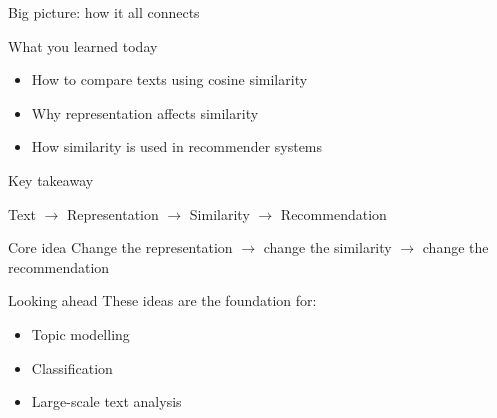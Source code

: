 \documentclass[compress]{beamer}
\begin{document}
\begin{frame}{Big picture: how it all connects}
\centering
{}

\vspace{0.6cm}

\begin{block}{What you learned today}
\begin{itemize}
\item How to compare texts using cosine similarity
\item Why representation affects similarity
\item How similarity is used in recommender systems
\end{itemize}
\end{block}
\end{frame}

\begin{frame}{Key takeaway}
\begin{center}
\Large
Text $\rightarrow$ Representation $\rightarrow$ Similarity $\rightarrow$ Recommendation
\end{center}

\vspace{1cm}

\begin{alertblock}{Core idea}
Change the representation $\rightarrow$ change the similarity $\rightarrow$ change the recommendation
\end{alertblock}

\pause

\begin{block}{Looking ahead}
These ideas are the foundation for:
\begin{itemize}
\item Topic modelling
\item Classification
\item Large-scale text analysis
\end{itemize}
\end{block}
\end{frame}
\end{document}
